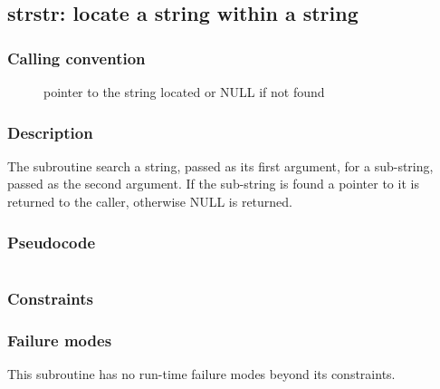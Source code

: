 \clearpage
{}
{}
\label{subr:strstr}
\subsection*{strstr: locate a string within a string}

\subsubsection*{Calling convention}

\begin{description}
\item[] pointer to the string located or NULL if not found
\end{description}

\subsubsection*{Description}

The  subroutine search a string, passed as its first
argument, for a sub-string, passed as the second argument.  If the
sub-string is found a pointer to it is returned to the caller,
otherwise NULL is returned.

\subsubsection*{Pseudocode}

\begin{verbatim}
\end{verbatim}

\subsubsection*{Constraints}

\subsubsection*{Failure modes}

This subroutine has no run-time failure modes beyond its constraints.
